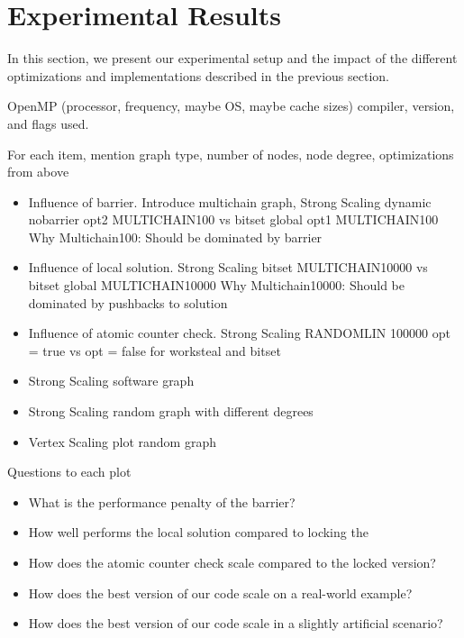 \section{Experimental Results}\label{sec:exp}
In this section, we present our experimental setup and the impact of the different optimizations and implementations described in the previous section.

\begin{invisible}
 \Cpp  OpenMP
 (processor, frequency, maybe OS, maybe cache sizes)
 compiler, version, and flags used.

 For each item, mention graph type, number of nodes, node degree, optimizations from above
 \begin{itemize}
  \item Influence of barrier. Introduce multichain graph, Strong Scaling dynamic nobarrier opt2 MULTICHAIN100 vs bitset global opt1 MULTICHAIN100 Why Multichain100: Should be dominated by barrier%
  \item Influence of local solution. Strong Scaling bitset MULTICHAIN10000 vs bitset global MULTICHAIN10000 Why Multichain10000: Should be dominated by pushbacks to solution
  \item Influence of atomic counter check. Strong Scaling RANDOMLIN 100000 opt = true vs opt = false for worksteal and bitset
  \item Strong Scaling software graph \cite{musco2014generative}
  \item Strong Scaling random graph with different degrees
  \item Vertex Scaling plot random graph
 \end{itemize}


Questions to each plot
\begin{itemize}
 \item What is the performance penalty of the barrier?
 \item How well performs the local solution compared to locking the 
 \item How does the atomic counter check scale compared to the locked version?
 \item How does the best version of our code scale on a real-world example?
 \item How does the best version of our code scale in a slightly artificial scenario?
\end{itemize}
\end{invisible}
